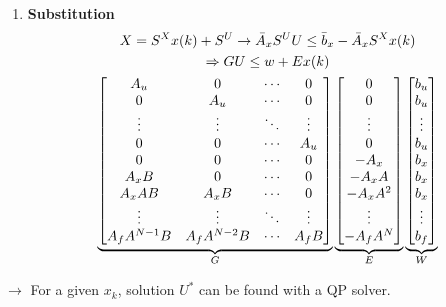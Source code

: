 \begin{enumerate}[resume]
    \item \textbf{Substitution}
    \begin{gather*}
        X = S^X x(k) + S^U \rightarrow \Bar{A}_x S^UU \leq \Bar{b}_x -\Bar{A}_x S^Xx(k)\\ \Rightarrow G U \leq w + E x(k)\\
      \underbrace{\begin{bmatrix}
        A_u & 0 & \dotsm & 0\\
        0 & A_u & \dotsm & 0 \\
        \vdots & \vdots & \ddots & \vdots \\
        0 & 0 & \dotsm & A_u\\ 
        0 & 0 &\dotsm & 0 \\ 
        A_xB & 0 & \dotsm & 0 \\
        A_x AB & A_x B &\dotsm & 0 \\
        \vdots & \vdots & \ddots & \vdots \\
        A_fA^{N-1}B & A_fA^{N-2}B&
        \dotsm & A_f B 
        \end{bmatrix}}_G
        \underbrace{\begin{bmatrix}
        0 \\ 0 \\ \vdots \\ 0 \\ -A_x \\ -A_x A \\ -A_xA^2\\ \vdots \\ -A_fA^N
        \end{bmatrix}}_E \underbrace{\begin{bmatrix}
        b_u \\ b_u \\ \vdots \\ b_u \\ b_x \\ b_x \\ b_x\\ \vdots \\b_f
        \end{bmatrix}}_W
    \end{gather*}
\end{enumerate}
$\rightarrow$ For a given $x_k$, solution $U^*$ can be found with a QP solver. 
